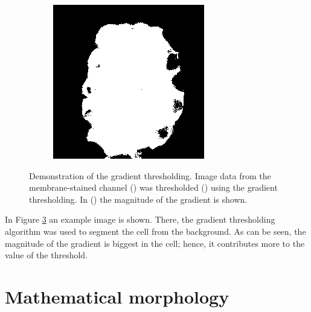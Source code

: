 \documentclass[
  digital,     %
  oneside,     %
  nosansbold,  %
  nocolorbold, %
  lof,         %
  lot,         %
]{fithesis4}
\begin{document}
\begin{figure}
\begin{subfigure}{0.3\linewidth}
        \caption{}
        \label{fig:grad-thresh-grad}
    \end{subfigure}
    \begin{subfigure}{0.3\linewidth}
        \centering
        \includegraphics[width=\textwidth]{./resources/grad-thresh-final.png}
        \caption{}
        \label{fig:grad-thresh-final}
    \end{subfigure}
    \caption{Demonstration of the gradient thresholding. Image data from the
    membrane-stained channel () was thresholded
    () using the gradient thresholding. In
    () the magnitude of the gradient is shown.}
    \label{fig:demo_grad_thresh}
\end{figure}

In Figure \ref{fig:demo_grad_thresh} an example image is shown. There, the
gradient thresholding algorithm was used to segment the cell from the
background. As can be seen, the magnitude of the gradient is biggest in the
cell; hence, it contributes more to the value of the threshold.

\section{Mathematical morphology}
\end{document}
